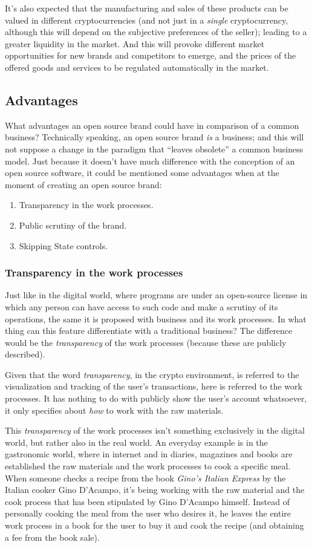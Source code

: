 \documentclass[12pt,a4paper]{article}
\begin{document}
It's also expected that the manufacturing and sales of these products can be valued in different cryptocurrencies (and not just in a \textit{single} cryptocurrency, although this will depend on the subjective preferences of the seller); leading to a greater liquidity in the market. And this will provoke different market opportunities for new brands and competitors to emerge, and the prices of the offered goods and services to be regulated automatically in the market.

\subsection{Advantages}
What advantages an open source brand could have in comparison of a common business? Technically speaking, an open source brand \textit{is} a business; and this will not suppose a change in the paradigm that “leaves obsolete” a common business model. Just because it doesn't have much difference with the conception of an open source software, it could be mentioned some advantages when at the moment of creating an open source brand:

\begin{enumerate}
\item Transparency in the work processes.
\item Public scrutiny of the brand.
\item Skipping State controls.
\end{enumerate}

\subsubsection{Transparency in the work processes}
Just like in the digital world, where programs are under an open-source license in which any person can have access to such code and make a scrutiny of its operations, the same it is proposed with business and its work processes. In what thing can this feature differentiate with a traditional business? The difference would be the \textit{transparency} of the work processes (because these are publicly described).

Given that the word \textit{transparency}, in the crypto environment, is referred to the visualization and tracking of the user's transactions, here is referred to the work processes. It has nothing to do with publicly show the user's account whatsoever, it only specifies about \textit{how} to work with the raw materials.

This \textit{transparency} of the work processes isn't something exclusively in the digital world, but rather also in the real world. An everyday example is in the gastronomic world, where in internet and in diaries, magazines and books are established the raw materials and the work processes to cook a specific meal. When someone checks a recipe from the book \textit{Gino's Italian Express} by the Italian cooker Gino D'Acampo, it's being working with the raw material and the cook process that has been stipulated by Gino D'Acampo himself. Instead of personally cooking the meal from the user who desires it, he leaves the entire work process in a book for the user to buy it and cook the recipe (and obtaining a fee from the book sale).
\end{document}
